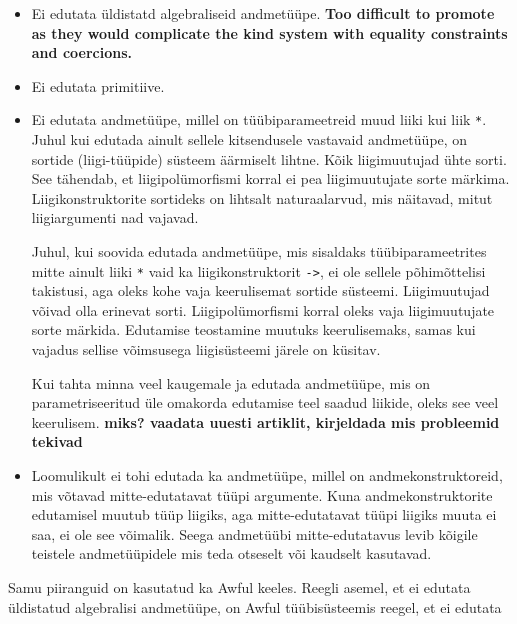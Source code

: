 \documentclass[12pt]{article}
\newcommand\markus[1]{\textcolor{roheline}{\textbf{#1}}}
\begin{document}
        \begin{itemize}
          \item
            Ei edutata üldistatd algebraliseid andmetüüpe. \markus{Too difficult to promote as they would complicate the kind system with equality constraints and coercions.}
          \item
            Ei edutata primitiive.
          \item
            Ei edutata andmetüüpe, millel on tüübiparameetreid muud liiki kui liik \verb!*!. Juhul kui edutada ainult sellele kitsendusele vastavaid andmetüüpe, on sortide (liigi-tüüpide) süsteem äärmiselt lihtne. Kõik liigimuutujad ühte sorti. See tähendab, et liigipolümorfismi korral ei pea liigimuutujate sorte märkima. Liigikonstruktorite sortideks on lihtsalt naturaalarvud, mis näitavad, mitut liigiargumenti nad vajavad.

            Juhul, kui soovida edutada andmetüüpe, mis sisaldaks tüübiparameetrites mitte ainult liiki \verb!*! vaid ka liigikonstruktorit \verb!->!, ei ole sellele põhimõttelisi takistusi, aga oleks kohe vaja keerulisemat sortide süsteemi. Liigimuutujad võivad olla erinevat sorti. Liigipolümorfismi korral oleks vaja liigimuutujate sorte märkida. Edutamise teostamine muutuks keerulisemaks, samas kui vajadus sellise võimsusega liigisüsteemi järele on küsitav.

            Kui tahta minna veel kaugemale ja edutada andmetüüpe, mis on parametriseeritud üle omakorda edutamise teel saadud liikide, oleks see veel keerulisem. \markus{miks? vaadata uuesti artiklit, kirjeldada mis probleemid tekivad}
          \item
            Loomulikult ei tohi edutada ka andmetüüpe, millel on andmekonstruktoreid, mis võtavad mitte-edutatavat tüüpi argumente. Kuna andmekonstruktorite edutamisel muutub tüüp liigiks, aga mitte-edutatavat tüüpi liigiks muuta ei saa, ei ole see võimalik. Seega andmetüübi mitte-edutatavus levib kõigile teistele andmetüüpidele mis teda otseselt või kaudselt kasutavad.
        \end{itemize}

        Samu piiranguid on kasutatud ka Awful keeles. Reegli asemel, et ei edutata üldistatud algebralisi andmetüüpe, on Awful tüübisüsteemis reegel, et ei edutata
\begin{comment}
    \begin{kysimus}{Should we promote this?}
      \begin{verbatim}
data Fun (t :: *) (u :: *) = Fun (t -> u)\end{verbatim}
    \end{kysimus}
\end{comment}
\end{document}
